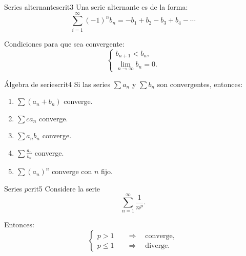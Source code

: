 \begin{teorema}{Series alternantes}{crit3}
    Una serie alternante es de la forma:
    \[
        \sum_{i=1}^{\infty} (-1)^n b_n = -b_1 + b_2 - b_3 + b_4 - \cdots
    \]

    Condiciones para que sea convergente:
    \[
        \begin{cases}
            b_{n+1} < b_n, \\
            \lim_{n \to \infty} b_n = 0.
        \end{cases}
    \]
\end{teorema}

\begin{teorema}{Álgebra de series}{crit4}
    Si las series $\sum a_n$ y $\sum b_n$ son convergentes, entonces:
    \begin{enumerate}
        \item $\sum (a_n + b_n)$ converge.
        \item $\sum c a_n$ converge.
        \item $\sum a_n b_n$ converge.
        \item $\sum \frac{a_n}{b_n}$ converge.
        \item $\sum (a_n)^n$ converge con $n$ fijo.
    \end{enumerate}
\end{teorema}

\begin{teorema}{Series $p$}{crit5}
    Considere la serie
    \[
        \sum_{n=1}^{\infty} \frac{1}{n^p}.
    \]

    Entonces:
    \[
        \begin{cases}
            p > 1 \quad &\Rightarrow \quad \text{converge}, \\
            p \leq 1 \quad &\Rightarrow \quad \text{diverge}.
        \end{cases}
    \]
\end{teorema}

